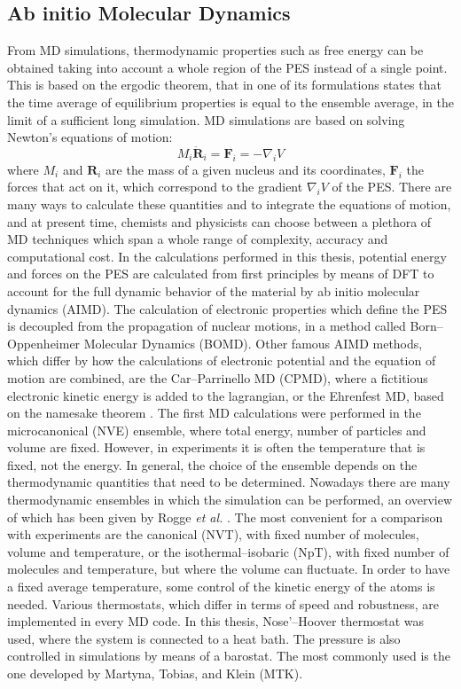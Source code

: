 \subsection*{Ab initio Molecular Dynamics}
From MD simulations, thermodynamic properties such as free energy can be obtained taking into account a whole region of the PES instead of a single point. This is based on the ergodic theorem, that in one of its formulations states that the time average of equilibrium properties is equal to the ensemble average, in the limit of a sufficient long simulation. 
\npar
MD simulations are based on solving Newton’s equations of motion:
\[
M_i \ddot{\mathbf{R}}_i = \mathbf{F}_i = - \nabla_i V
\]
where $M_i$ and $\mathbf{R}_i$ are the mass of a given nucleus and its coordinates, $\mathbf{F}_i$ the forces that act on it, which correspond to the gradient $\nabla_i V$ of the PES. There are many ways to calculate these quantities and to integrate the equations of motion, and at present time, chemists and physicists can choose between a plethora of MD techniques which span a whole range of complexity, accuracy and computational cost. 
In the calculations performed in this thesis, potential energy and forces on the PES are calculated from first principles by means of DFT to account for the full dynamic behavior of the material by ab initio molecular dynamics (AIMD). The calculation of electronic properties which define the PES is decoupled from the propagation of nuclear motions, in a method called Born--Oppenheimer Molecular Dynamics (BOMD). Other famous AIMD methods, which differ by how the calculations of electronic potential and the equation of motion are combined, are the Car--Parrinello MD (CPMD)\cite{Car1985}, where a fictitious electronic kinetic energy is added to the lagrangian, or the Ehrenfest MD, based on the namesake theorem \cite{Ehrenfest1927, Marx2009}. 
\npar
The first MD calculations were performed in the microcanonical (NVE) ensemble, where total energy, number of particles and volume are fixed. However, in experiments it is often the temperature that is fixed, not the energy. In general, the choice of the ensemble depends on the thermodynamic quantities that need to be determined. Nowadays there are many thermodynamic ensembles in which the simulation can be performed, an overview of which has been given by Rogge \textit{et al.} \cite{rogge2015comparison}. The most convenient for a comparison with experiments are the canonical (NVT), with fixed number of molecules, volume and temperature, or the isothermal--isobaric (NpT), with fixed number of molecules and temperature, but where the volume can fluctuate. In order to have a fixed average temperature, some control of the kinetic energy of the atoms is needed. Various thermostats, which differ in terms of speed and robustness, are implemented in every MD code. In this thesis, Nose’--Hoover thermostat was used, where the system is connected to a heat bath. The pressure is also controlled in simulations by means of a barostat. The most commonly used is the one developed by Martyna, Tobias, and Klein (MTK)\cite{Martyna1994}.

